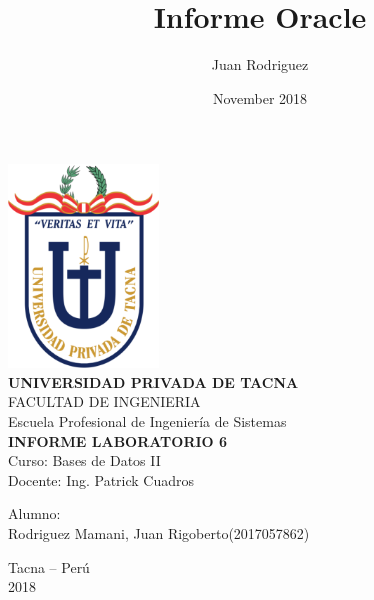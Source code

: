 \documentclass[12pt,letterpaper]{article}
\title{Informe Oracle}
\author{Juan Rodriguez}
\date{November 2018}
\begin{document}
    
    \begin{center}
        \includegraphics[width=4cm]{Imagenes/upt-logo.png}\\
        \vspace{12pt}
        \vspace{12pt}
        \large\textbf{UNIVERSIDAD PRIVADA DE TACNA}\\
        \vspace{12pt}
        \vspace{12pt}
        \large{FACULTAD DE INGENIERIA}\\
        \vspace{12pt}
        \vspace{12pt}
        \large{Escuela Profesional de Ingeniería de Sistemas}\\
        \vspace{12pt}
        \vspace{12pt}
        \textbf{INFORME LABORATORIO 6}\\
        \vspace{12pt}
        \vspace{12pt}
        Curso: Bases de Datos II\\
        \vspace{12pt}
        Docente: Ing. Patrick Cuadros\\
        \vspace*{12pt}
           \begin{flushleft}
        Alumno:\\
        \vspace{12pt}
        Rodriguez Mamani, Juan Rigoberto\hfill (2017057862)\\

        \end{flushleft}
        \vspace{100pt}

        Tacna – Perú\\
            2018
        \vspace{12pt}

            \thispagestyle{empty} %
            \setcounter{page}{0} %
    \end{center}
    \break
\end{document}
